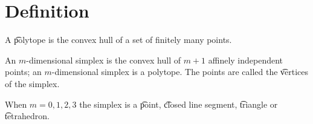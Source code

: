 

\section*{Definition}

A \t{polytope} is the convex hull of a set of finitely many points.

An \t{$m$-dimensional simplex} is the convex hull of $m+1$ affinely independent points; an $m$-dimensional simplex is a polytope.
The points are called the \t{vertices} of the simplex.

When $m = 0, 1, 2, 3$ the simplex is a \t{point}, \t{closed line segment}, \t{triangle} or \t{tetrahedron}.

\blankpage
